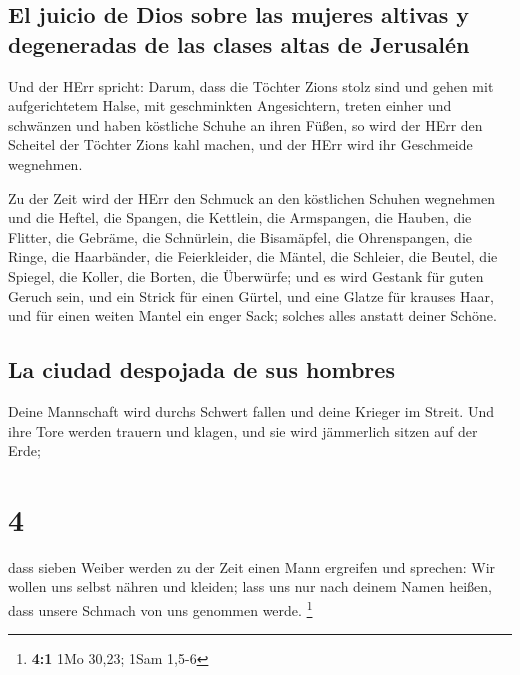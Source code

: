 \hypertarget{el-juicio-de-dios-sobre-las-mujeres-altivas-y-degeneradas-de-las-clases-altas-de-jerusaluxe9n}{%
\subsection{El juicio de Dios sobre las mujeres altivas y degeneradas de
las clases altas de
Jerusalén}\label{el-juicio-de-dios-sobre-las-mujeres-altivas-y-degeneradas-de-las-clases-altas-de-jerusaluxe9n}}

 Und der HErr spricht: Darum, dass die Töchter Zions
stolz sind und gehen mit aufgerichtetem Halse, mit geschminkten
Angesichtern, treten einher und schwänzen und haben köstliche Schuhe an
ihren Füßen,  so wird der HErr den Scheitel der Töchter
Zions kahl machen, und der HErr wird ihr Geschmeide wegnehmen.

 Zu der Zeit wird der HErr den Schmuck an den köstlichen
Schuhen wegnehmen und die Heftel, die Spangen,  die
Kettlein, die Armspangen, die Hauben,  die Flitter, die
Gebräme, die Schnürlein, die Bisamäpfel, die Ohrenspangen,
 die Ringe, die Haarbänder,  die
Feierkleider, die Mäntel, die Schleier, die Beutel,  die
Spiegel, die Koller, die Borten, die Überwürfe;  und es
wird Gestank für guten Geruch sein, und ein Strick für einen Gürtel, und
eine Glatze für krauses Haar, und für einen weiten Mantel ein enger
Sack; solches alles anstatt deiner Schöne.

\hypertarget{la-ciudad-despojada-de-sus-hombres}{%
\subsection{La ciudad despojada de sus
hombres}\label{la-ciudad-despojada-de-sus-hombres}}

 Deine Mannschaft wird durchs Schwert fallen und deine
Krieger im Streit.  Und ihre Tore werden trauern und
klagen, und sie wird jämmerlich sitzen auf der Erde;

\hypertarget{section-3}{%
\section{4}\label{section-3}}

 dass sieben Weiber werden zu der Zeit einen Mann
ergreifen und sprechen: Wir wollen uns selbst nähren und kleiden; lass
uns nur nach deinem Namen heißen, dass unsere Schmach von uns genommen
werde. \footnote{\textbf{4:1} 1Mo 30,23; 1Sam 1,5-6}


